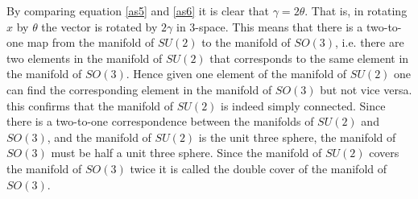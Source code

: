 By comparing equation \eqref{as5} and \eqref{as6} it is clear that $\gamma=2\theta$. That is, in rotating $\hat{x}$ by $\theta$ the vector is rotated by $2\gamma$ in 3-space. This means that there is a two-to-one map from the manifold of $SU(2)$ to the manifold of $SO(3)$, i.e. there are two elements in the manifold of $SU(2)$ that corresponds to the same element in the manifold of $SO(3)$. Hence given one element of the manifold of $SU(2)$ one can find the corresponding element in the manifold of $SO(3)$ but not vice versa. this confirms that the manifold of $SU(2)$ is indeed simply connected. Since there is a two-to-one correspondence between the manifolds of $SU(2)$ and $SO(3)$, and the manifold of $SU(2)$ is the unit three sphere, the manifold of $SO(3)$ must be half a unit three sphere. Since the manifold of $SU(2)$ covers the manifold of $SO(3)$ twice it is called the double cover of the manifold of $SO(3)$.

